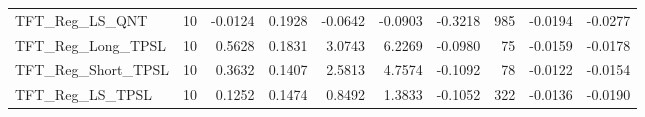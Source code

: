 \begin{tabular}{llrrrrrrrr}
\cline{1-10}
TFT\_Reg\_LS\_QNT & 10 & -0.0124 & 0.1928 & -0.0642 & -0.0903 & -0.3218 & 985 & -0.0194 & -0.0277 \\
\cline{1-10}
TFT\_Reg\_Long\_TPSL & 10 & 0.5628 & 0.1831 & 3.0743 & 6.2269 & -0.0980 & 75 & -0.0159 & -0.0178 \\
\cline{1-10}
TFT\_Reg\_Short\_TPSL & 10 & 0.3632 & 0.1407 & 2.5813 & 4.7574 & -0.1092 & 78 & -0.0122 & -0.0154 \\
\cline{1-10}
TFT\_Reg\_LS\_TPSL & 10 & 0.1252 & 0.1474 & 0.8492 & 1.3833 & -0.1052 & 322 & -0.0136 & -0.0190 \\
\cline{1-10}
\bottomrule
\end{tabular}
